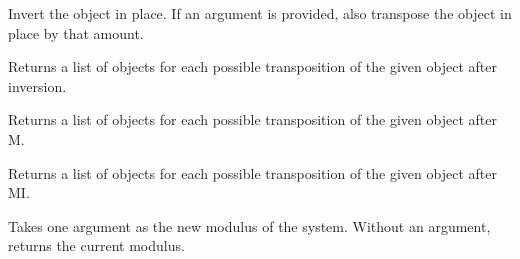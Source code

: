 \documentclass[letterpaper,10pt,english]{sphinxmanual}
\begin{document}
\begin{fulllineitems}
\begin{fulllineitems}
\end{fulllineitems}


\begin{fulllineitems}
\label{_templates/core:core.SetRowBase.i}
Invert the object in place. If an argument is provided, also transpose
the object in place by that amount.

\end{fulllineitems}


\begin{fulllineitems}
\label{_templates/core:core.SetRowBase.i_rotations}
Returns a list of objects for each possible transposition of the given
object after inversion.

\end{fulllineitems}


\begin{fulllineitems}
\label{_templates/core:core.SetRowBase.m_rotations}
Returns a list of objects for each possible transposition of the given
object after M.

\end{fulllineitems}


\begin{fulllineitems}
\label{_templates/core:core.SetRowBase.mi_rotations}
Returns a list of objects for each possible transposition of the given
object after MI.

\end{fulllineitems}


\begin{fulllineitems}
\label{_templates/core:core.SetRowBase.mod}
Takes one argument as the new modulus of the system.
Without an argument, returns the current modulus.

\end{fulllineitems}



\end{fulllineitems}
\end{document}
